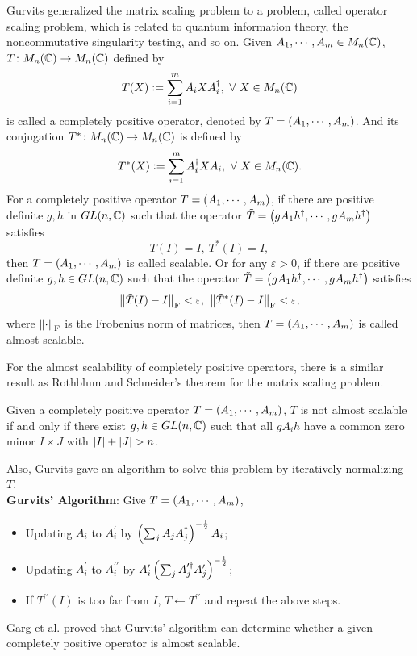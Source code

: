 \documentclass[suri,pdfbookmark]{engsuribt} %
\begin{document}
  Gurvits \cite{key15} generalized the matrix scaling problem to a problem, called operator scaling problem, which is related to quantum information theory, the noncommutative singularity testing, and so on. Given $A_1, \cdots, A_m \in M_n(\mathbb{C})$, $T \colon M_n(\mathbb{C}) \rightarrow M_n(\mathbb{C})$ defined by
  \begin{equation*}
    T(X) \vcentcolon= \sum_{i=1}^m A_iXA_i^{\dagger},~\forall~X \in M_n(\mathbb{C})
  \end{equation*}
  is called a completely positive operator, denoted by $T = \left(A_1, \cdots, A_m\right)$. And its conjugation $T^{*} \colon M_n(\mathbb{C}) \rightarrow M_n(\mathbb{C})$ is defined by
  \begin{equation*}
    T^*(X) \vcentcolon= \sum_{i=1}^m A_i^{\dagger}XA_i,~\forall~X \in M_n(\mathbb{C}).
  \end{equation*}
  For a completely positive operator $T = \left(A_1, \cdots, A_m\right)$, if there are positive definite $g,h$ in $GL(n,\mathbb{C})$ such that the operator $\tilde{T}= \left(gA_1h^{\dagger}, \cdots, gA_mh^{\dagger}\right)$ satisfies
  \begin{equation*}
    T(I) = I,~T^*(I) = I,
  \end{equation*}
  then $T = \left(A_1, \cdots, A_m\right)$ is called scalable. Or for any $\varepsilon > 0$, if there are positive definite $g,h\in GL(n,\mathbb{C})$ such that the operator $\tilde{T}= \left(gA_1h^{\dagger}, \cdots, gA_mh^{\dagger}\right)$ satisfies
  \begin{equation*}
    \left\lVert\tilde{T}(I)-I\right\lVert_{\operatorname{F}} < \varepsilon,~\left\lVert\tilde{T}^*(I)-I\right\lVert_{\operatorname{F}} < \varepsilon,
  \end{equation*}
  where $\left\lVert\cdot\right\lVert_{\operatorname{F}}$ is the Frobenius norm of matrices, then $T = \left(A_1, \cdots, A_m\right)$ is called almost scalable. 

  For the almost scalability of completely positive operators, there is a similar result as Rothblum and Schneider's theorem for the matrix scaling problem.
  \begin{thm}
    Given a completely positive operator $T = \left(A_1, \cdots, A_m\right)$, $T$ is not almost scalable if and only if there exist $g,h \in GL(n,\mathbb{C})$ such that all $gA_ih$ have a common zero minor $I \times J$ with $\left\lvert I\right\lvert + \left\lvert J\right\lvert > n$.
  \end{thm}
  Also, Gurvits gave an algorithm to solve this problem by iteratively normalizing $T$.\vspace{0.5em}\\
  \textbf{Gurvits' Algorithm}: Give $T = \left(A_1, \cdots, A_m\right)$,
  \begin{itemize}
    \item Updating $A_i$ to $A_i^{\prime}$ by $\left(\sum_jA_jA_j^{\dagger}\right)^{-\frac{1}{2}}A_i$;
    \item Updating $A_i^{\prime}$ to $A_i^{\prime\prime}$ by $A_i^{\prime}\left(\sum_jA_j^{\prime \dagger}A_j^{\prime}\right)^{-\frac{1}{2}}$;
    \item If $T^{\prime\prime}(I)$ is too far from $I$, $T \leftarrow T^{\prime\prime}$ and repeat the above steps.
  \end{itemize} 
  Garg et al. \cite{key13} proved that Gurvits' algorithm can determine whether a given completely positive operator is almost scalable. 
\end{document}
